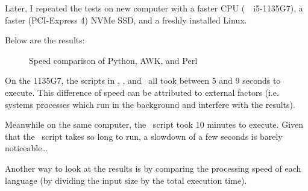 Later, I repeated the tests on new computer with a faster CPU (\Intel\ \Core~i5-1135G7), a faster (PCI-Express 4) NVMe SSD, and a freshly installed Linux. \\

\newpage

Below are the results:

\begin{figure}[h]
	\caption{Speed comparison of Python, AWK, and Perl}
	\medskip
	\pgfplotsset{compat=newest}
\end{figure}

\medskip

On the 1135G7, the scripts in \awk, \perl, and \julia\ all took between 5 and 9 seconds to execute. This difference of speed can be attributed to external factors (i.e. systems processes which run in the background and interfere with the results).

Meanwhile on the same computer, the \python\ script took 10 minutes to execute. 
Given that the \python\ script takes so long to run, a slowdown of a few seconds is barely noticeable\dots \\


\medskip

Another way to look at the results is by comparing the processing speed of each language (by dividing the input size by the total execution time). \\
 

